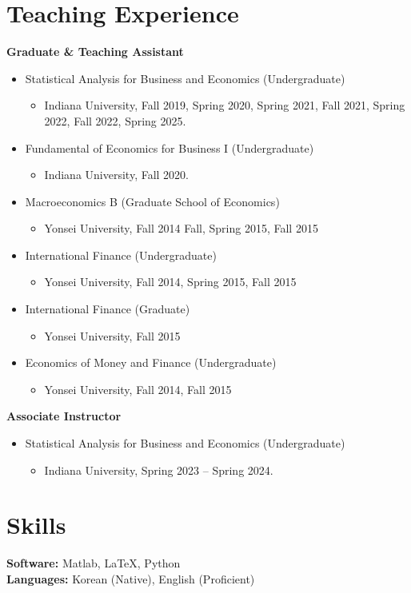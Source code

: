 \documentclass[11pt,a4paper]{article}
\begin{document}
\section*{Teaching Experience}
\textbf{Graduate \& Teaching Assistant} 
\begin{itemize}[leftmargin=*]   
\item Statistical Analysis for Business and Economics (Undergraduate)
    \begin{itemize}[leftmargin=*]
        \item Indiana University, Fall 2019, Spring 2020, Spring 2021, Fall 2021, Spring 2022, Fall 2022, Spring 2025.
    \end{itemize}    
\item Fundamental of Economics for Business I (Undergraduate)
    \begin{itemize}[leftmargin=*]
        \item Indiana University, Fall 2020.
    \end{itemize}
\item Macroeconomics B (Graduate School of Economics)
    \begin{itemize}[leftmargin=*]
        \item Yonsei University, Fall 2014 Fall, Spring 2015, Fall 2015
    \end{itemize}
\item International Finance (Undergraduate)
    \begin{itemize}[leftmargin=*]
        \item Yonsei University, Fall 2014, Spring 2015, Fall 2015
    \end{itemize}
\item International Finance (Graduate)
    \begin{itemize}[leftmargin=*]
        \item Yonsei University, Fall 2015
    \end{itemize}    
\item Economics of Money and Finance (Undergraduate)
    \begin{itemize}[leftmargin=*]
        \item Yonsei University, Fall 2014, Fall 2015
    \end{itemize}

\end{itemize}

\textbf{Associate Instructor}
\begin{itemize}[leftmargin=*]   
    \item Statistical Analysis for Business and Economics (Undergraduate)
    \begin{itemize}[leftmargin=*]
        \item Indiana University, Spring 2023 -- Spring 2024.
    \end{itemize}
\end{itemize}

\section*{Skills}
\textbf{Software:} Matlab, LaTeX, Python \\
\textbf{Languages:} Korean (Native), English (Proficient)
\end{document}
